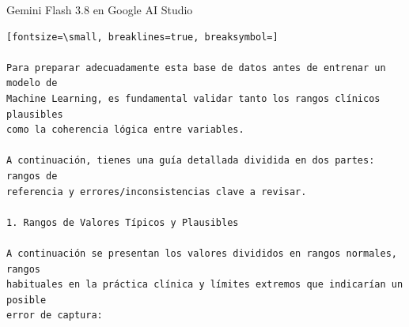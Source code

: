 \documentclass[12pt,a4paper,oneside]{book}
\begin{document}
\begin{iaresp}{Gemini Flash 3.8 en Google AI Studio}
\begin{Verbatim}[fontsize=\small, breaklines=true, breaksymbol=]

Para preparar adecuadamente esta base de datos antes de entrenar un modelo de
Machine Learning, es fundamental validar tanto los rangos clínicos plausibles
como la coherencia lógica entre variables.

A continuación, tienes una guía detallada dividida en dos partes: rangos de
referencia y errores/inconsistencias clave a revisar.

1. Rangos de Valores Típicos y Plausibles

A continuación se presentan los valores divididos en rangos normales, rangos
habituales en la práctica clínica y límites extremos que indicarían un posible
error de captura:


\end{Verbatim}
\end{iaresp}
\end{document}
